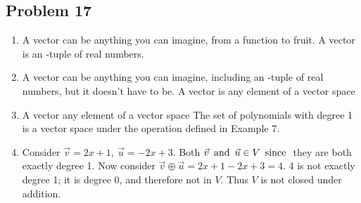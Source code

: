 \subsection*{Problem 17}
\begin{enumerate}
   A vector is a directed line segment (an arrow)
  \item[] A vector can be anything you can imagine, from a function to fruit.
     A vector is an -tuple of real numbers.
  \item[] A vector can be anything you can imagine, including an -tuple of real numbers, but it doesn't have to be.
     A vector is any element of a vector space
  \item[] A vector  any element of a vector space
     The set of polynomials with degree  1 is a vector space under the operation defined in Example 7.\
  \item[] Consider $\vec{v} = 2x + 1,~\vec{u} = -2x +3$. Both $\vec{v} \operatorname{~\text{and}~} \vec{u} \in V \operatorname{~\text{since}~}$ they are both exactly degree 1.
    Now consider $\vec{v} \oplus \vec{u} = 2x +1 -2x +3 = 4$. $4$ is not exactly degree 1; it is degree 0, and therefore not in $V$.
    Thus $V$ is not closed under addition.
\end{enumerate}

